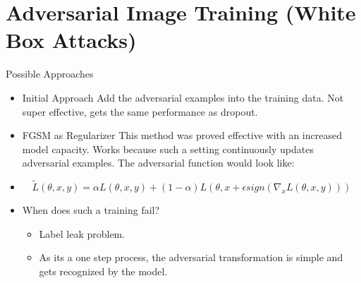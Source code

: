 \documentclass[10pt]{beamer}
\begin{document}
\section{Adversarial Image Training   (White Box Attacks)}
\begin{frame}{Possible Approaches}
	\begin{itemize}
		\item[] {
			\begin{block}{Initial Approach}
				Add the adversarial examples  into the training data. Not super effective, gets the same performance as dropout.
			\end{block}
		}
		\pause
		\item[] {
			\begin{block}{FGSM as Regularizer}
				This method was proved effective with an increased model capacity. Works because such a setting continuously updates adversarial examples.
				The adversarial function would look like: 
			\end{block}
		}
	\pause
		\item[] {
			\begin{equation}\label{fgsm}
				\tilde{L}(\theta,x,y) = \alpha L(\theta,x,y) + (1-\alpha)L(\theta,x + \epsilon sign(\nabla_{x} L(\theta, x,y)))
			\end{equation}
		}
	\pause
	\item[] {
		\begin{alertblock}{When does such a training fail?}
			\begin{itemize}
				\item Label leak problem.
				\item As its a one step process, the adversarial transformation is simple and gets recognized by the model.
			\end{itemize}
			
		\end{alertblock}
	}
\end{itemize}
\end{frame}
\end{document}
